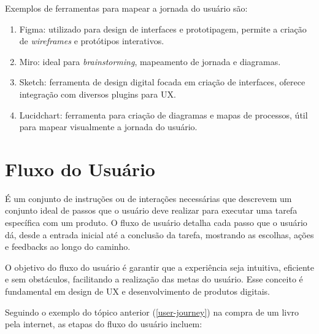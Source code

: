 \documentclass[
  12pt,
  openright,
  twoside,
  a4paper,
  english,
  french,
  spanish,
  brazil
]{abntex2}
\begin{document}
Exemplos de ferramentas para mapear a jornada do usuário são:

\begin{enumerate}
  \item
    Figma: utilizado para design de interfaces e prototipagem, permite a criação
    de \textit{wireframes} e protótipos interativos.
  \item
    Miro: ideal para \textit{brainstorming}, mapeamento de jornada e diagramas.
  \item
    Sketch: ferramenta de design digital focada em criação de interfaces,
    oferece integração com diversos plugins para UX.
  \item
    Lucidchart: ferramenta para criação de diagramas e mapas de processos, útil
    para mapear visualmente a jornada do usuário.
\end{enumerate}

\section{Fluxo do Usuário}

É um conjunto de instruções ou de interações necessárias que descrevem um
conjunto ideal de passos que o usuário deve realizar para executar uma tarefa
específica com um produto. O fluxo de usuário detalha cada passo que o usuário
dá, desde a entrada inicial até a conclusão da tarefa, mostrando as escolhas,
ações e feedbacks ao longo do caminho.

O objetivo do fluxo do usuário é garantir que a experiência seja intuitiva,
eficiente e sem obstáculos, facilitando a realização das metas do usuário. Esse
conceito é fundamental em design de UX e desenvolvimento de produtos digitais.

Seguindo o exemplo do tópico anterior (\ref{user-journey}) na compra de um livro
pela internet, as etapas do fluxo do usuário incluem:
\end{document}
